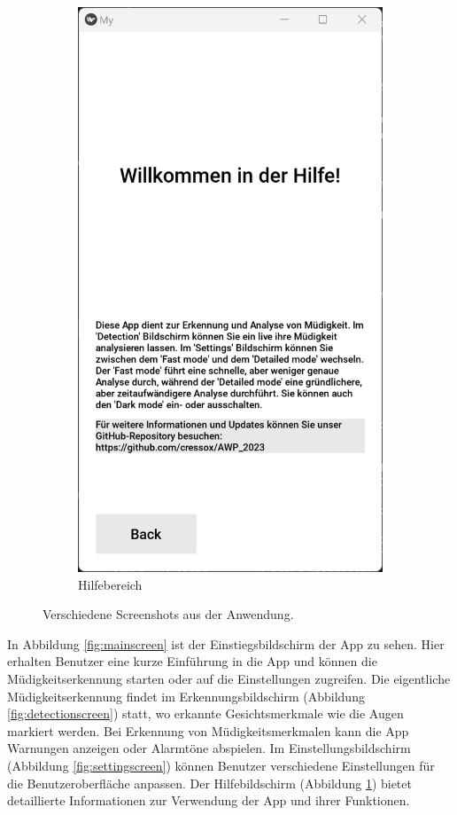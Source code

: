 \begin{figure}[h]
\begin{subfigure}[b]{0.22\textwidth}
		\includegraphics[width=\linewidth]{images/helpscreen.png}
		\caption{Hilfebereich}
		\label{fig:helpscreen}
	\end{subfigure}
    \caption{Verschiedene Screenshots aus der Anwendung.}
    \label{fig:screens}
\end{figure}

In Abbildung \ref{fig:mainscreen} ist der Einstiegsbildschirm der App zu sehen. Hier erhalten Benutzer eine kurze Einführung in die App und können die Müdigkeitserkennung starten oder auf die Einstellungen zugreifen. Die eigentliche Müdigkeitserkennung findet im Erkennungsbildschirm (Abbildung \ref{fig:detectionscreen}) statt, wo erkannte Gesichtsmerkmale wie die Augen markiert werden. Bei Erkennung von Müdigkeitsmerkmalen kann die App Warnungen anzeigen oder Alarmtöne abspielen. Im Einstellungsbildschirm (Abbildung \ref{fig:settingscreen}) können Benutzer verschiedene Einstellungen für die Benutzeroberfläche anpassen. Der Hilfebildschirm (Abbildung \ref{fig:helpscreen}) bietet detaillierte Informationen zur Verwendung der App und ihrer Funktionen.

